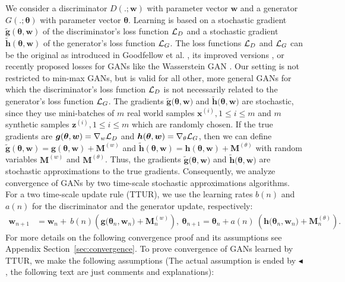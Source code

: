 \documentclass{article}
\newcommand\Bg{\bm{g}}
\newcommand\Bh{\bm{h}}
\newcommand\Bw{\bm{w}}
\newcommand\Bx{\bm{x}}
\newcommand\Bz{\bm{z}}
\newcommand\BM{\bm{M}}
\newcommand\Bth{\bm{\theta}}
\renewcommand{\leq}{\leqslant}
\begin{document}
We consider a
discriminator $D(.;\Bw)$ with parameter vector $\Bw$
and a generator $G(.;\Bth)$ with parameter vector $\Bth$.
Learning is based on a
stochastic gradient $\tilde{\Bg}(\Bth,\Bw)$
of the discriminator's loss function $\mathcal{L}_D$
and a stochastic gradient $\tilde{\Bh}(\Bth, \Bw)$ of the generator's loss function $\mathcal{L}_G$.
The loss functions $\mathcal{L}_D$ and $\mathcal{L}_G$
can be the original as introduced in Goodfellow et al. \cite{Goodfellow:14nips},
its improved versions \cite{Goodfellow:17tutorial}, or recently proposed losses for GANs like the
Wasserstein GAN \cite{Arjovsky:17}. Our setting is not restricted to min-max
GANs, but is valid for all other, more general GANs for which the
discriminator's loss function $\mathcal{L}_D$ is not necessarily related to the
generator's loss function $\mathcal{L}_G$.
The gradients
$\tilde{\Bg}\big(\Bth, \Bw\big)$ and $\tilde{\Bh}\big(\Bth, \Bw \big)$
are stochastic, since they use mini-batches of $m$ real world samples
$\Bx^{(i)},1\leq i \leq m$ and $m$ synthetic samples $\Bz^{(i)},1\leq
i \leq m$ which are randomly chosen.
If the true gradients are $\Bg(\Bth,\Bw)=\nabla_{w} \cL_D$ and
$\Bh(\Bth,\Bw)=\nabla_{\theta}\cL_G$, then we can define
$\tilde{\Bg}(\Bth,\Bw)=\Bg(\Bth,\Bw)+\BM^{(w)}$ and
$\tilde{\Bh}(\Bth,\Bw)=\Bh(\Bth,\Bw)+\BM^{(\theta)}$ with random
variables $\BM^{(w)}$ and $\BM^{(\theta)}$.
Thus, the gradients
$\tilde{\Bg}\big(\Bth, \Bw\big)$ and $\tilde{\Bh}\big(\Bth, \Bw \big)$
are stochastic approximations to the true gradients.
Consequently, we analyze convergence of GANs
by two time-scale stochastic approximations algorithms.
For a two time-scale update rule (TTUR),
we use the learning rates $b(n)$ and $a(n)$ for the discriminator and
the generator update, respectively:
\begin{align}
\label{eq:iterBorkar}
\Bw_{n+1}   &=  \Bw_n   +\ b(n)
\left(\Bg\big(\Bth_n, \Bw_n\big)  +  \BM^{(w)}_{n}\right),\
\Bth_{n+1}   =   \Bth_n  +  a(n) \
\left(\Bh\big(\Bth_n, \Bw_n \big)  +  \BM^{(\theta)}_{n}\right)  .
\end{align}
For more details on the following convergence proof and its assumptions
see Appendix Section~\ref{sec:convergence}.
To prove convergence of GANs learned by TTUR, we make the following
assumptions (The actual assumption is ended by $\blacktriangleleft$, the
following text are just comments and explanations):
\end{document}
